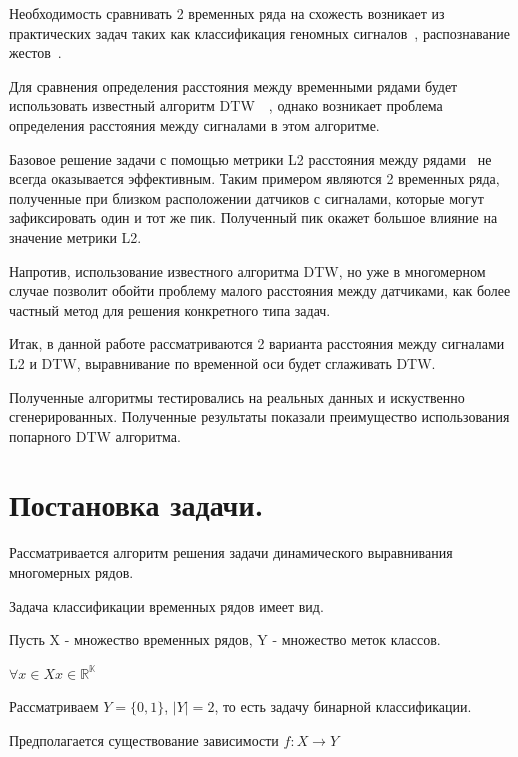 \documentclass[12pt, twoside]{article}
\begin{document}
Необходимость сравнивать 2 временных ряда на схожесть возникает из практических задач таких как классификация геномных сигналов~\cite{Skutkova2013}, распознавание жестов~\cite{Holt2007}.  



Для сравнения определения расстояния между временными рядами будет использовать известный алгоритм DTW~\cite{Keogh01derivativedynamic}~\cite{SalvadorC07}, однако возникает проблема определения расстояния между сигналами в этом алгоритме.

Базовое решение задачи с помощью метрики L2 расстояния между рядами~\cite{Sanguasat2012} не всегда оказывается эффективным. Таким примером являются 2 временных ряда, полученные при близком расположении датчиков с сигналами, которые могут зафиксировать один и тот же пик. Полученный пик окажет большое влияние на значение метрики L2.

Напротив, использование известного алгоритма DTW, но уже в многомерном случае позволит обойти проблему малого расстояния между датчиками, как более частный метод для решения конкретного типа задач.

Итак, в данной работе рассматриваются 2 варианта расстояния между сигналами L2 и DTW, выравнивание по временной оси будет сглаживать DTW.

Полученные алгоритмы тестировались на реальных данных и искуственно сгенерированных. Полученные результаты показали преимущество использования попарного DTW алгоритма.


\section{Постановка задачи.}

Рассматривается алгоритм решения задачи динамического выравнивания многомерных рядов.

Задача классификации временных рядов имеет вид.

Пусть X - множество временных рядов, Y - множество меток классов.

$\forall x \in X x \in \mathbb{R^K}$

Рассматриваем $Y = \{0, 1\}$,  $|Y| = 2$, то есть задачу бинарной классификации.

Предполагается существование зависимости $f: X \rightarrow Y$
\end{document}
